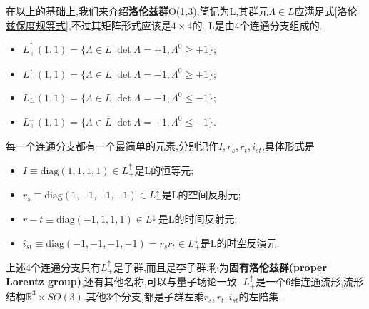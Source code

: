 \documentclass[../main.tex]{subfiles}
\begin{document}
 在以上的基础上,我们来介绍\textbf{洛伦兹群}O(1,3),简记为L,其群元$\Lambda \in L$应满足式\ref{洛伦兹保度规等式},不过其矩阵形式应该是$4\times4$的.
 L是由4个连通分支组成的.
 \begin{itemize}
     \item $L^\uparrow_+(1,1)  =\{\Lambda \in L | \det\Lambda = +1, \Lambda^0{} \ge +1\}$;  
     \item $L^\uparrow_-(1,1)  =\{\Lambda \in L | \det\Lambda = -1, \Lambda^0{} \ge +1\}$;  
     \item $L^\downarrow_-(1,1)=\{\Lambda \in L | \det\Lambda = -1, \Lambda^0{} \le -1\}$;
     \item $L^\downarrow_+(1,1)=\{\Lambda \in L | \det\Lambda = +1, \Lambda^0{} \le -1\}$.
 \end{itemize}
 每一个连通分支都有一个最简单的元素,分别记作$I,r_s,r_t,i_{st}$,具体形式是
 \begin{itemize}
     \item $ I\equiv \text{diag}(1,1,1,1)\in L^\uparrow_+  $是L的恒等元;
     \item $ r_s\equiv \text{diag}(1,-1,-1,-1)\in L^\uparrow_- $是L的空间反射元;
     \item $ r-t\equiv \text{diag}(-1,1,1,1)\in L^\downarrow_-$是L的时间反射元;
     \item $ i_{st}\equiv \text{diag}(-1,-1,-1,-1) = r_s r_t\in L^\downarrow_+$是L的时空反演元.  
 \end{itemize}
   上述4个连通分支只有$L^\uparrow_+$是子群,而且是李子群,称为\textbf{固有洛伦兹群(proper Lorentz group)},还有其他名称,可以与量子场论一致.
 $L^\uparrow_+$是一个6维连通流形,流形结构$\mathbb{R}^3 \times SO(3)$.其他3个分支,都是子群左乘$r_s,r_t,i_{st}$的左陪集.
\end{document}
